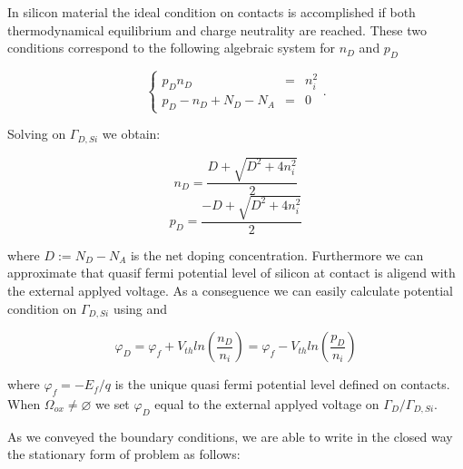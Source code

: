 In silicon material the ideal condition on contacts is accomplished if both thermodynamical equilibrium and charge neutrality are reached. These two conditions correspond to the following algebraic system for $n_D$ and $p_D$

\begin{equation}
\label{eq: systemo for dirichlet condition}
\left\{
\begin{array}{lcl}
p_Dn_D & = &n_i^2 \\
p_D -n_D +N_D-N_A & = & 0 
\end{array}
\right. .
\end{equation}

Solving  on $\Gamma_{D,Si}$ we obtain:

\begin{equation}
n_D = \dfrac{D + \sqrt{D^2+4n_i^2}}{2}
\end{equation}
\begin{equation}
p_D = \dfrac{-D + \sqrt{D^2+4n_i^2}}{2}
\end{equation}

where $D := N_D-N_A$ is the net doping concentration. Furthermore  we can approximate that quasif fermi potential level of silicon at contact is aligend with the external applyed voltage. As a conseguence we can easily calculate potential condition on $\Gamma_{D,Si}$ using  and 

\begin{equation}
\varphi_D = \varphi_f + V_{th}ln\left( \dfrac{n_D}{n_i} \right) = \varphi_f - V_{th}ln\left( \dfrac{p_D}{n_i} \right)
\end{equation}

where $\varphi_f = - E_f / q$ is the unique quasi fermi potential level defined on contacts. When $\Omega_{ox} \neq \varnothing$ we set $\varphi_D$ equal to the external applyed voltage on $\Gamma_D / \Gamma_{D,Si}$.


As we conveyed the boundary conditions, we are able to write in the closed way the stationary form of problem  as follows:
 

